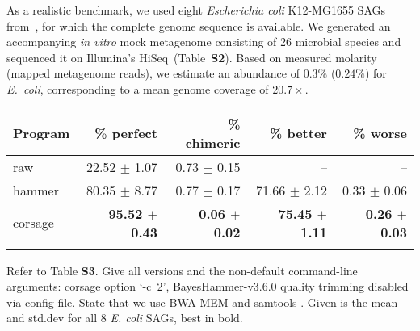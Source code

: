 \documentclass{bioinfo}
\begin{document}
As a realistic benchmark, we used eight \textit{Escherichia coli} K12-MG1655 SAGs from~\citealp{scott2}, for which the complete genome sequence is available.
We generated an accompanying \emph{in vitro} mock metagenome consisting of 26 microbial species and sequenced it on Illumina's HiSeq~(Table~\textbf{S2}). %
Based on measured molarity (mapped metagenome reads), we estimate an abundance of $0.3\%$ ($0.24\%$) for \textit{E.~coli}, corresponding to a mean genome coverage of $20.7\times$. %

\begin{table}[t]
{\footnotesize
\begin{tabular}{lrrrr}
\toprule
Program  & \% perfect            & \% chimeric               & \% better             & \% worse \\
\midrule
raw      & 22.52 $\pm$ 1.07      & 0.73 $\pm$ 0.15           & --                    & -- \\
hammer   & 80.35 $\pm$ 8.77      & 0.77 $\pm$ 0.17           & 71.66 $\pm$ 2.12      & 0.33 $\pm$ 0.06 \\
corsage  & \textbf{95.52 $\pm$ 0.43}      & \textbf{0.06 $\pm$ 0.02}           & \textbf{75.45 $\pm$ 1.11}      & \textbf{0.26 $\pm$ 0.03} \\
\botrule
\end{tabular}}{Refer to Table \textbf{S3}. %
Give all versions and the non-default command-line arguments: corsage option `\mbox{-c 2}', BayesHammer-v3.6.0 quality trimming disabled via config file.
State that we use BWA-MEM \citep{bwamem} and samtools \citep{samtools}.
Given is the mean and std.dev for all 8 \textit{E. coli} SAGs, best in bold.
}
\end{table}
\end{document}
